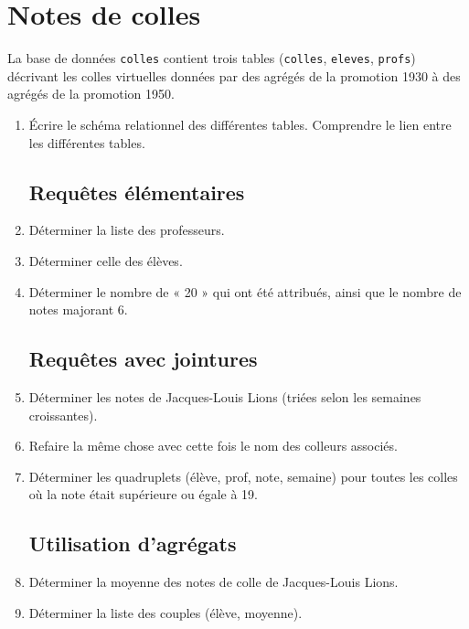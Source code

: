 \newpage
\section{Notes de colles}

La base de données \verb|colles| contient trois tables (\verb|colles|, \verb|eleves|, \verb|profs|) décrivant les colles virtuelles données par des agrégés de la promotion 1930 à des agrégés de la promotion 1950.
\begin{enumerate}

\subsection{Structure de la base de données}

\item Écrire le schéma relationnel des différentes tables. Comprendre le lien entre les différentes tables.

\subsection{Requêtes élémentaires}

\item Déterminer la liste des professeurs.
\item Déterminer celle des élèves.
\item Déterminer le nombre de « 20 » qui ont été attribués, ainsi que le nombre de notes majorant 6.

\subsection{Requêtes avec jointures}
\item Déterminer les notes de Jacques-Louis Lions (triées selon les semaines croissantes).
\item Refaire la même chose avec cette fois le nom des colleurs associés.
\item Déterminer les quadruplets (élève, prof, note, semaine) pour toutes les colles où la note était supérieure
ou égale à 19.

\subsection{Utilisation d'agrégats}

\item Déterminer la moyenne des notes de colle de Jacques-Louis Lions.

\item Déterminer la liste des couples (élève, moyenne).


\end{enumerate}

